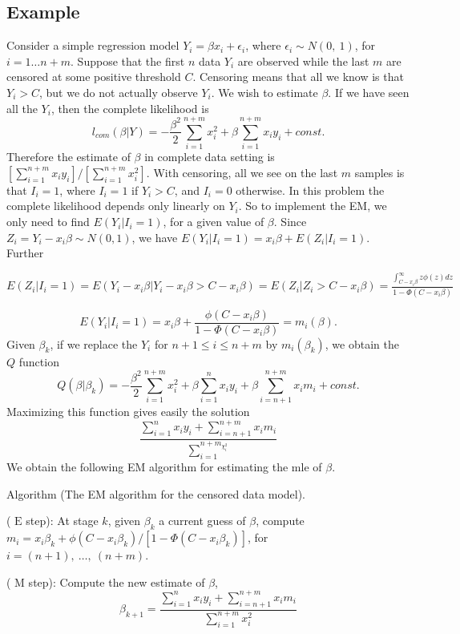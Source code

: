 \documentclass[12pt]{article}
\begin{document}
\subsection*{Example}
Consider a simple regression model $Y_{i}=\beta x_{i}+\epsilon_{i}$, where $\epsilon_{i}\sim N(0,\ 1)$, for $ i=1\ldots n+m$. 
Suppose that the first $n$ data $Y_{i}$ are observed while the last $m$ are censored at some positive threshold $C$. 
Censoring means that all we know is that $Y_{i}>C$, but we do not actually observe $Y_{i}$. 
We wish to estimate $\beta$. If we have seen all the $Y_{i}$, then the complete likelihood is
$$
l_{com}(\beta|Y)=-\frac{\beta^{2}}{2}\sum_{i=1}^{n+m}x_{i}^{2}+\beta\sum_{i=1}^{n+m}x_{i}y_{i}+const.
$$
Therefore the estimate of $\beta$ in complete data setting is $[\displaystyle \sum_{i=1}^{n+m}x_{i}y_{i}]/[\sum_{i=1}^{n+m}x_{i}^{2}]$. With censoring, all we see on the last $m$ samples is that $I_{i}=1$, where $I_{i}=1$ if $Y_{i}>C$, and $I_{i}=0$ otherwise. In this problem the complete likelihood depends only linearly on $Y_{i}$. So to implement the EM, we only need to find $E(Y_{i}|I_{i}=1)$, for a given value of $\beta$. Since $Z_{i}=Y_{i}-x_{i}\beta\sim N(0,1)$, we have $E(Y_{i}|I_{i}=1)=x_{i}\beta+E(Z_{i}|I_{i}=1)$. Further

$E(Z_{i}|I_{i}=1)=E(Y_{i}-x_{i}\displaystyle \beta|Y_{i}-x_{i}\beta>C-x_{i}\beta)=E(Z_{i}|Z_{i}>C-x_{i}\beta)=\frac{\int_{C-x_{i}\beta}^{\infty}z\phi(z)dz}{1-\Phi(C-x_{i}\beta)}$

$$
E(Y_{i}|I_{i}=1)=x_{i}\beta+\frac{\phi(C-x_{i}\beta)}{1-\Phi(C-x_{i}\beta)}=m_{i}(\beta).
$$
Given $\beta_{k}$, if we replace the $Y_{i}$ for $n+1\leq i\leq n+m$ by $m_{i}(\beta_{k})$, we obtain the $Q$ function
$$
Q(\beta|\beta_{k})=-\frac{\beta^{2}}{2}\sum_{i=1}^{n+m}x_{i}^{2}+\beta\sum_{i=1}^{n}x_{i}y_{i}+\beta\sum_{i=n+1}^{n+m}x_{i}m_{i}+const.
$$
Maximizing this function gives easily the solution
$$
\frac{\sum_{i=1}^{n}x_{i}y_{i}+\sum_{i=n+1}^{n+m}x_{i}m_{i}}{\sum_{i=1}^{n+m_{\chi_{i}^{2}}}}
$$
We obtain the following EM algorithm for estimating the mle of $\beta$.

Algorithm (The EM algorithm for the censored data model).

( $\mathrm{E}$ step): At stage $k$, given $\beta_{k}$ a current guess of $\beta$, compute $m_{i}=x_{i}\beta_{k}+\phi(C-x_{i}\beta_{k})/[1-\Phi(C-x_{i}\beta_{k})]$, for $i=(n+1),\ \ldots,\ (n+m)$.

( $\mathrm{M}$ step): Compute the new estimate of $\beta$,
$$
\beta_{k+1}=\frac{\sum_{i=1}^{n}x_{i}y_{i}+\sum_{i=n+1}^{n+m}x_{i}m_{i}}{\sum_{i=1}^{n+m}x_{i}^2}
$$
\end{document}
